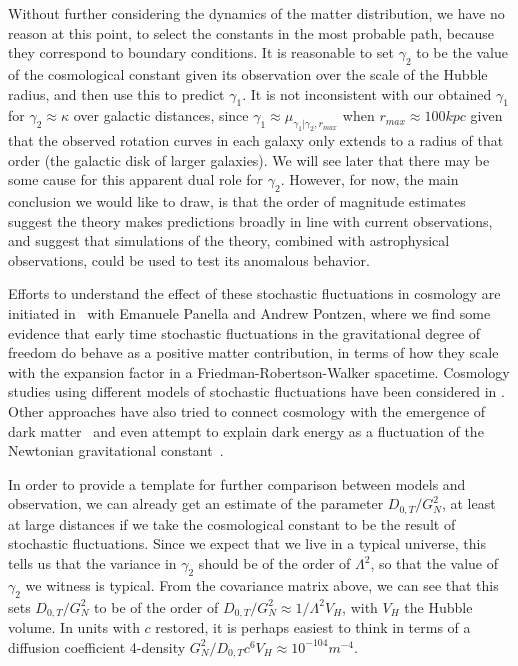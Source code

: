 \documentclass[aps,pra,amsmath,amssymb,amsthm,floatfix,nofootinbib,notitlepage,superscriptaddress,10pt]{revtex4-2}
\begin{document}
Without further considering the dynamics of the matter distribution, we have no reason at this point, to select the constants in the most probable path, because they correspond to boundary conditions. It is reasonable to set $\gamma_2$ to be the value of the cosmological constant given its observation over the scale of the Hubble radius, and then use this to predict $\gamma_1$. It is not inconsistent with our obtained $\gamma_1$ for $\gamma_2\approx\kappa$ over galactic distances, since $\gamma_1\approx\mu_{\gamma_1|\gamma_2,r_{max}}$ when $r_{max}\approx 100 kpc$ given that the observed rotation curves in each galaxy only extends to a radius of that order (the galactic disk of larger galaxies). 
We will see later that there may be some cause for this apparent dual role for $\gamma_2$. However, for now, the main conclusion we would like to draw, is that the order of magnitude estimates suggest the theory makes predictions broadly in line with current observations, and suggest that simulations of the theory, combined with astrophysical observations, could be used to test its anomalous behavior. 

Efforts to understand the effect of these stochastic fluctuations in cosmology are initiated in~\cite{UCLcosmo} with Emanuele Panella and Andrew Pontzen, where we find some evidence that early time stochastic fluctuations in the gravitational degree of freedom do behave as a positive matter contribution, in terms of how they scale with the expansion factor in a Friedman-Robertson-Walker spacetime. 
Cosmology studies using different models of stochastic fluctuations have been considered in \cite{launay2024stochastic,Colas:2023wxa}. Other approaches have also tried to connect cosmology with the emergence of dark matter~\cite{kaplan2023classical} and even attempt to explain dark energy as a fluctuation of the Newtonian gravitational constant~\cite{deCesare:2016dnp}.

In order to provide a template for further comparison between models and observation, we can already get an estimate of the parameter $D_{0,T}/G_N^2$, at least at large distances if we take the cosmological constant to be the result of stochastic fluctuations. 
Since we expect that we live in a typical universe, this tells us that the variance in $\gamma_2$ should be of the order of $\Lambda^2$, so that the value of $\gamma_2$ we witness is typical. From the covariance matrix above, we can see that this sets  $D_{0,T}/G_N^2$ to be of the order of $D_{0,T}/G_N^2\approx 1/\Lambda^2V_H$, with $V_H$ the Hubble volume. 
In units with $c$ restored, it is perhaps easiest to think in terms of a diffusion coefficient 4-density 
$G_N^2/D_{0,T}c^6 V_H\approx 10^{-104}m^{-4}$.  
\end{document}
